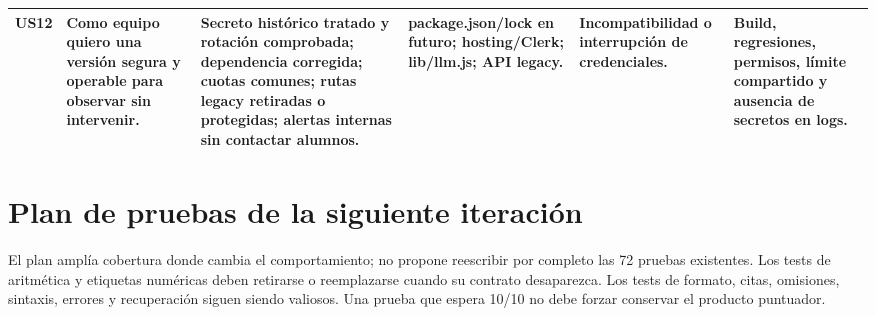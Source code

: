 \documentclass[11pt,a4paper]{report}
\begin{document}
\begin{landscape}
\begin{longtable}{P{0.9cm}P{4.6cm}P{6.2cm}P{4.4cm}P{3.2cm}P{3.8cm}}
US12 & Como equipo quiero una versión segura y operable para observar sin intervenir. & Secreto histórico tratado y rotación comprobada; dependencia corregida; cuotas comunes; rutas legacy retiradas o protegidas; alertas internas sin contactar alumnos. & package.json/lock en futuro; hosting/Clerk; lib/llm.js; API legacy. & Incompatibilidad o interrupción de credenciales. & Build, regresiones, permisos, límite compartido y ausencia de secretos en logs.\\\bottomrule
\end{longtable}
\end{landscape}

\chapter{Plan de pruebas de la siguiente iteración}
\label{ch:pruebas}
El plan amplía cobertura donde cambia el comportamiento; no propone reescribir por completo las 72 pruebas existentes. Los tests de aritmética y etiquetas numéricas deben retirarse o reemplazarse cuando su contrato desaparezca. Los tests de formato, citas, omisiones, sintaxis, errores y recuperación siguen siendo valiosos. Una prueba que espera 10/10 no debe forzar conservar el producto puntuador.
\end{document}
